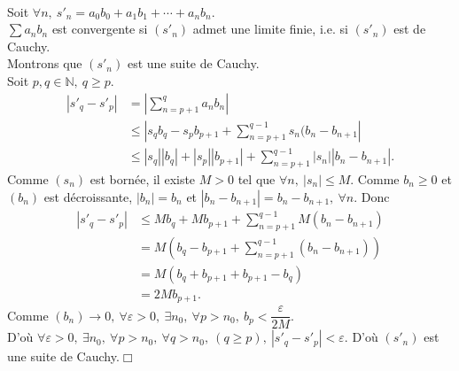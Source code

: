 \documentclass[11pt, a4paper]{book}
\newenvironment{pr}{\noindent {\bf Preuve} \noindent} {\hfill $\Box$\vskip 5mm}
\begin{document}
\begin{pr}\\ Soit $\forall n,~s'_n=a_0 b_0+a_1 b_1+\cdots+a_n b_n.$\\ $\sum a_n b_n$ est convergente si $(s'_n)$ admet une limite finie, i.e. si $(s'_n)$ est de Cauchy.\\ Montrons que $(s'_n)$ est une suite de Cauchy.\\
 Soit $p,q \in \mathbb{N},~q\geq p.$ \begin{align*} |s'_q-s'_p|&=|\sum_{n=p+1}^q a_n b_n|\\ &\leq |s_q b_q-s_p b_{p+1} +\sum_{n=p+1}^{q-1}s_n (b_n-b_{n+1}|\\ &\leq |s_q||b_q|+|s_p||b_{p+1}|+\sum_{n=p+1}^{q-1}|s_n||b_n-b_{n+1}|. \end{align*} 
 Comme $(s_n)$ est born\'ee, il existe $M>0$ tel que $\forall n,~|s_n|\leq M.$ Comme $b_n \geq 0$ et $(b_n)$ est d\'ecroissante, $|b_n|=b_n$ et $|b_n -b_{n+1}|=b_n -b_{n+1},~\forall n.$ 
 Donc \begin{align*} |s'_q -s'_p|&\leq M b_q +M b_{p+1} +\sum_{n=p+1}^{q-1}M(b_n -b_{n+1})\\&=M(b_q-b_{p+1}+\sum_{n=p+1}^{q-1}(b_n-b_{n+1}))\\ &= M(b_q+b_{p+1}+b_{p+1}-b_q)\\ &=2Mb_{p+1}.\end{align*}
Comme $(b_n)\rightarrow 0,~\forall \varepsilon>0,~\exists n_0,~\forall p>n_0,~ b_p<\dfrac{\varepsilon}{2M}.$\\ D'o\`u $\forall \varepsilon >0,~\exists n_0,~ \forall p>n_0,~\forall q>n_0,~(q\geq p),~|s'_q-s'_p|<\varepsilon.$ D'o\`u $(s'_n)$ est une suite de Cauchy.\end{pr} 
\end{document}
